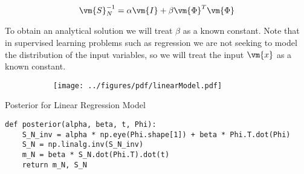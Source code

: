\begin{equation}
 \vm{S}_N^{-1} = \alpha \vm{I} + \beta \vm{\Phi}^T\vm{\Phi}
\end{equation}


To obtain an analytical solution we will treat $\beta$ as a known constant.
Note that in supervised learning problems such as regression we are not seeking to model the distribution of the input variables, so we will treat the input $\vm{x}$ as a known constant.


\begin{figure}[H]
\begin{subfigure}[t]{0.32\textwidth}
\texttt{[image: ../figures/pdf/linearModel.pdf]}
\end{subfigure}
\end{figure}


\begin{algorithm}[H]  
  \caption{Posterior for Linear Regression Model}
  \label{alg:posterior_for_linear_regression_model}
\begin{lstlisting}
def posterior(alpha, beta, t, Phi):
    S_N_inv = alpha * np.eye(Phi.shape[1]) + beta * Phi.T.dot(Phi)
    S_N = np.linalg.inv(S_N_inv)
    m_N = beta * S_N.dot(Phi.T).dot(t)
    return m_N, S_N
\end{lstlisting}
\end{algorithm}

